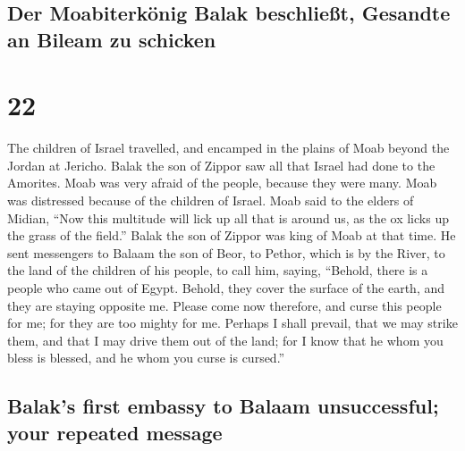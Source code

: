 \hypertarget{der-moabiterkuxf6nig-balak-beschlieuxdft-gesandte-an-bileam-zu-schicken}{%
\subsection{Der Moabiterkönig Balak beschließt, Gesandte an Bileam zu
schicken}\label{der-moabiterkuxf6nig-balak-beschlieuxdft-gesandte-an-bileam-zu-schicken}}

\hypertarget{section-21}{%
\section{22}\label{section-21}}

 The children of Israel travelled, and encamped in the
plains of Moab beyond the Jordan at Jericho.  Balak the
son of Zippor saw all that Israel had done to the Amorites.
 Moab was very afraid of the people, because they were
many. Moab was distressed because of the children of Israel.
 Moab said to the elders of Midian, ``Now this multitude
will lick up all that is around us, as the ox licks up the grass of the
field.'' Balak the son of Zippor was king of Moab at that time.
 He sent messengers to Balaam the son of Beor, to Pethor,
which is by the River, to the land of the children of his people, to
call him, saying, ``Behold, there is a people who came out of Egypt.
Behold, they cover the surface of the earth, and they are staying
opposite me.  Please come now therefore, and curse this
people for me; for they are too mighty for me. Perhaps I shall prevail,
that we may strike them, and that I may drive them out of the land; for
I know that he whom you bless is blessed, and he whom you curse is
cursed.''

\hypertarget{balaks-first-embassy-to-balaam-unsuccessful-your-repeated-message}{%
\subsection{Balak's first embassy to Balaam unsuccessful; your repeated
message}\label{balaks-first-embassy-to-balaam-unsuccessful-your-repeated-message}}

